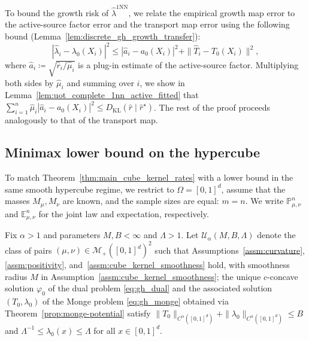 \documentclass[11pt,reqno]{amsart}
\theoremstyle{definition}
\newcommand{\KL}{\mathrm{KL}}
\renewcommand{\hat}{\widehat}
\newcommand{\mM}{\mathcal{M}}
\begin{document}
To bound the growth risk of $\hat\lambda^{\mathrm{1NN}}$, we relate the empirical growth map error to the active-source factor error and the transport map error using the following bound (Lemma~\ref{lem:discrete_gh_growth_transfer}):
\begin{equation}
 |\hat\lambda_i-\lambda_0(X_i)|^2 \le |\hat a_i-a_0(X_i)|^2+\|\hat T_i-T_0(X_i)\|^2,
\end{equation}
where $\hat a_i \coloneqq \sqrt{\hat r_i/\hat\mu_i}$ is a plug-in estimate of the active-source factor. Multiplying both sides by $\hat\mu_i$ and summing over $i$, we show in Lemma~\ref{lem:uot_complete_1nn_active_fitted} that
$
\sum_{i=1}^n \hat\mu_i |\hat a_i-a_0(X_i)|^2 \le {D_\KL}(\hat r\mid \hat r^\star)
$. The rest of the proof proceeds analogously to that of the transport map.


\subsection{Minimax lower bound on the hypercube}
\label{sec:minimax_lower_bound}

To match Theorem~\ref{thm:main_cube_kernel_rates} with a lower bound in the same smooth hypercube regime, we restrict to $\Omega=[0,1]^d$, assume that the masses $M_\mu,M_\nu$ are known, and the sample sizes are equal: $m=n$. 
We write $\mathbb P_{\mu,\nu}^n$ and $\mathbb E_{\mu,\nu}^n$ for the joint law and expectation, respectively.

Fix $\alpha>1$ and parameters $M,B<\infty$ and $\Lambda>1$. Let $\mathcal U_\alpha(M,B,\Lambda)$ denote the class of pairs $(\mu,\nu)\in\mM_+([0,1]^d)^2$ such that Assumptions~\ref{assm:curvature}, \ref{assm:positivity}, and~\ref{assm:cube_kernel_smoothness} hold, with smoothness radius $M$ in Assumption~\ref{assm:cube_kernel_smoothness}; the unique $c$-concave solution $\varphi_0$ of the dual problem \eqref{eq:gh_dual} and the associated solution $(T_0,\lambda_0)$ of the Monge problem \eqref{eq:gh_monge} obtained via Theorem~\ref{prop:monge-potential} satisfy $\|T_0\|_{C^\alpha([0,1]^d)}+\|\lambda_0\|_{C^\alpha([0,1]^d)}\le B$ and $\Lambda^{-1}\le \lambda_0(x)\le\Lambda$ for all $x\in[0,1]^d$.
\end{document}

